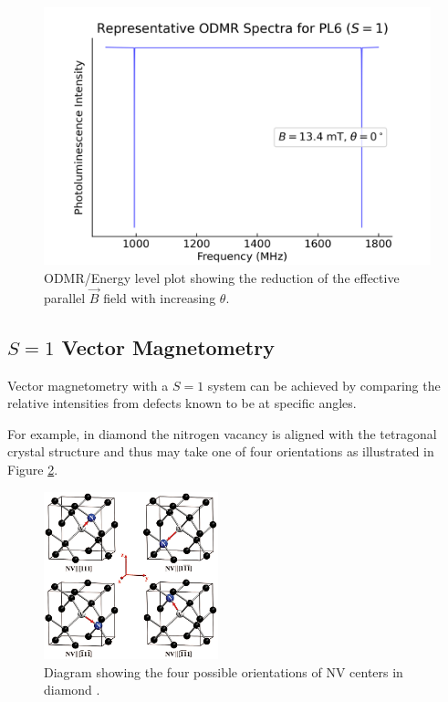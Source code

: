 
\begin{figure}[h]
	\begin{center}
		\includegraphics[width=\textwidth]{figures/PL6ODMRSpectra_theta_0_to_90.png}
	\end{center}
	\caption{ODMR/Energy level plot showing the reduction of the effective parallel $\vec{B}$ field with increasing $\theta$.}
	\label{fig:}
\end{figure}


\subsection{$S=1$ Vector Magnetometry}
Vector magnetometry with a $S=1$ system can be achieved by comparing the relative intensities from defects known to be at specific angles.

For example, in diamond the nitrogen vacancy is aligned with the tetragonal crystal structure and thus may take one of four orientations as illustrated in Figure \ref{fig:dnv_orientations}.

\begin{figure}[h]
	\begin{center}
		\includegraphics[width=0.45\textwidth]{figures/four_possible_NV_orientations.png}
	\end{center}
	\caption{Diagram showing the four possible orientations of NV centers in diamond \cite{pham}.}\label{fig:dnv_orientations}
\end{figure}


